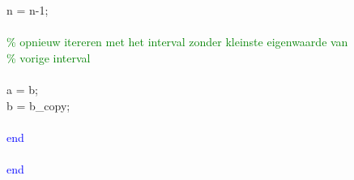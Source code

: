\hspace{1mm}\indent n = n-1; \\ 
\hspace{1mm}\indent  \\ 
\hspace{1mm}\indent \textcolor{green}{\% opnieuw itereren met het interval zonder kleinste eigenwaarde van }\\ 
\hspace{1mm}\indent \textcolor{green}{\% vorige interval }\\ 
\hspace{1mm}\indent  \\ 
\hspace{1mm}\indent a = b; \\ 
\hspace{1mm}\indent b = b\_copy; \\ 
\hspace{1mm}\indent  \\ 
\hspace{1mm}\textcolor{blue}{end} \\ 
\hspace{1mm} \\ 
\hspace{1mm}\textcolor{blue}{end} \\ 
\hspace{1mm} \\ 
